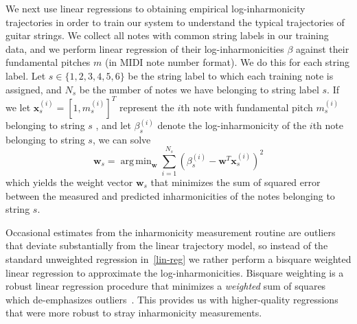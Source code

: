 \documentclass[convention,peer-reviewed]{aesconf}
\DeclareMathOperator*{\argmin}{arg\,min}
\begin{document}
We next use linear regressions to obtaining empirical log-inharmonicity trajectories in order to train our system to understand the typical trajectories of guitar strings. We collect all notes with common string labels in our training data, and we perform linear regression of their log-inharmonicities $\beta$ against their fundamental pitches $m$ (in MIDI note number format). We do this for each string label. Let $s \in \{1,2,3,4,5,6\}$ be the string label to which each training note is assigned, and $N_s$ be the number of notes we have belonging to string label $s$. If we let $\mathbf{x}_s^{(i)} = [1, m_s^{(i)}]^T$ represent the $i$th note with fundamental pitch $m^{(i)}_s$ belonging to string $s$ , and let $\beta_s^{(i)}$ denote the log-inharmonicity of the $i$th note belonging to string $s$, we can solve
\begin{equation}
\label{lin-reg}
\mathbf{w}_s = \argmin_{\mathbf{w}}{\sum_{i=1}^{N_s}{(\beta^{(i)}_s - \mathbf{w}^T\mathbf{x}^{(i)}_s)^2}}
\end{equation}
which yields the weight vector $\mathbf{w}_s$ that minimizes the sum of squared error between the measured and predicted inharmonicities of the notes belonging to string $s$.

Occasional estimates from the inharmonicity measurement routine are outliers that deviate substantially from the linear trajectory model, so instead of the standard unweighted regression in~\eqref{lin-reg} we rather perform a bisquare weighted linear regression to approximate the log-inharmonicities. Bisquare weighting is a robust linear regression procedure that minimizes a \textit{weighted} sum of squares which de-emphasizes outliers~\cite{matlab-robustfit}. This provides us with higher-quality regressions that were more robust to stray inharmonicity measurements.
\end{document}

